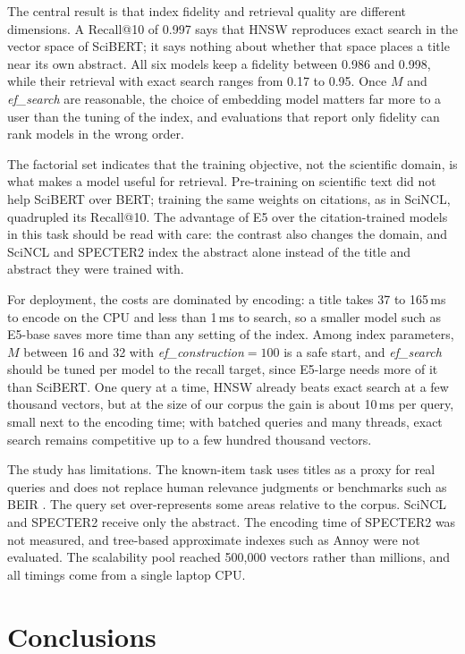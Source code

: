 \documentclass[runningheads]{llncs}
\newcommand{\efc}{\textit{ef\_construction}}
\newcommand{\efs}{\textit{ef\_search}}
\begin{document}
The central result is that index fidelity and retrieval quality are different dimensions. A
Recall@10 of 0.997 says that HNSW reproduces exact search in the vector space of SciBERT; it
says nothing about whether that space places a title near its own abstract. All six models
keep a fidelity between 0.986 and 0.998, while their retrieval with exact search ranges from
0.17 to 0.95. Once
$M$ and \efs{} are reasonable, the choice of embedding model matters far more to a user than
the tuning of the index, and evaluations that report only fidelity can rank models in the
wrong order.

The factorial set indicates that the training objective, not the scientific domain, is what
makes a model useful for retrieval. Pre-training on scientific text did not help SciBERT
over BERT; training the same weights on citations, as in SciNCL, quadrupled its Recall@10.
The advantage of E5 over the citation-trained models in this task should be read with care:
the contrast also changes the domain, and SciNCL and SPECTER2 index the abstract alone instead
of the title and abstract they were trained with.

For deployment, the costs are dominated by encoding: a title takes 37 to 165\,ms to encode on
the CPU and less than 1\,ms to search, so a smaller model such as E5-base saves more time than
any setting of the index. Among index parameters, $M$ between 16 and 32 with \efc{}$=100$ is a
safe start, and \efs{} should be tuned per model to the recall target, since E5-large needs
more of it than SciBERT. One query at a time, HNSW already beats exact search at a few
thousand vectors, but at the size of our corpus the gain is about 10\,ms per query, small next
to the encoding time; with batched queries and many threads, exact search remains competitive
up to a few hundred thousand vectors.

The study has limitations. The known-item task uses titles as a proxy for real queries and
does not replace human relevance judgments or benchmarks such as BEIR \cite{thakur2021}. The
query set over-represents some areas relative to the corpus. SciNCL and SPECTER2 receive only
the abstract. The encoding time of SPECTER2 was not measured, and tree-based approximate
indexes such as Annoy were not evaluated. The scalability pool reached 500,000 vectors rather
than millions, and all timings come from a single laptop CPU.

\section{Conclusions}
\end{document}

